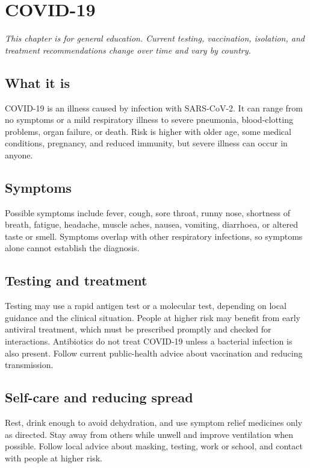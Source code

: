 \chapter{COVID-19}

\medskip
\noindent\textit{This chapter is for general education. Current testing, vaccination, isolation, and treatment recommendations change over time and vary by country.}

\section*{What it is}
COVID-19 is an illness caused by infection with SARS-CoV-2. It can range from no symptoms or a mild respiratory illness to severe pneumonia, blood-clotting problems, organ failure, or death. Risk is higher with older age, some medical conditions, pregnancy, and reduced immunity, but severe illness can occur in anyone.

\section*{Symptoms}
Possible symptoms include fever, cough, sore throat, runny nose, shortness of breath, fatigue, headache, muscle aches, nausea, vomiting, diarrhoea, or altered taste or smell. Symptoms overlap with other respiratory infections, so symptoms alone cannot establish the diagnosis.

\section*{Testing and treatment}
Testing may use a rapid antigen test or a molecular test, depending on local guidance and the clinical situation. People at higher risk may benefit from early antiviral treatment, which must be prescribed promptly and checked for interactions. Antibiotics do not treat COVID-19 unless a bacterial infection is also present. Follow current public-health advice about vaccination and reducing transmission.

\section*{Self-care and reducing spread}
Rest, drink enough to avoid dehydration, and use symptom relief medicines only as directed. Stay away from others while unwell and improve ventilation when possible. Follow local advice about masking, testing, work or school, and contact with people at higher risk.

